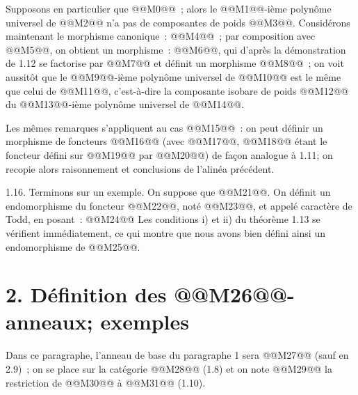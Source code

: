 
Supposons en particulier que @@M0@@~; alors le @@M1@@-ième polynôme universel de @@M2@@ n'a pas de composantes de poids @@M3@@. Considérons maintenant le morphisme canonique~: @@M4@@~; par composition avec @@M5@@, on obtient un morphisme~: @@M6@@, qui d'après la démonstration de 1.12 se factorise par @@M7@@ et définit un morphisme @@M8@@~; on voit aussitôt que le @@M9@@-ième polynôme universel de @@M10@@ est le même que celui de @@M11@@, c'est-à-dire la composante isobare de poids @@M12@@ du @@M13@@-ième polynôme universel de @@M14@@.

Les mêmes remarques s'appliquent au cas @@M15@@~: on peut définir un morphisme de foncteurs @@M16@@ (avec @@M17@@, @@M18@@ étant le foncteur défini sur @@M19@@ par @@M20@@) de façon analogue à 1.11; on recopie alors raisonnement et conclusions de l'alinéa précédent.

1.16. Terminons sur un exemple. On suppose que @@M21@@. On définit un endomorphisme du foncteur @@M22@@, noté @@M23@@, et appelé caractère de Todd, en posant~:
@@M24@@
Les conditions i) et ii) du théorème 1.13 se vérifient immédiatement, ce qui montre que nous avons bien défini ainsi un endomorphisme de @@M25@@.

\section*{2. Définition des @@M26@@-anneaux; exemples}

Dans ce paragraphe, l'anneau de base du paragraphe 1 sera @@M27@@ (sauf en 2.9)~; on se place sur la catégorie @@M28@@ (1.8) et on note @@M29@@ la restriction de @@M30@@ à @@M31@@ (1.10).

